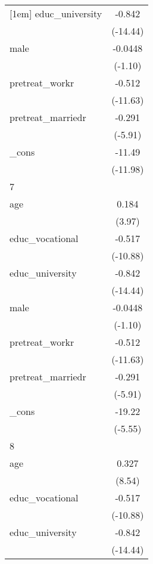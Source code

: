 {\begin{tabular}{l*{1}{c}}
[1em]
educ\_university&      -0.842\sym{***}\\
            &    (-14.44)         \\
[1em]
male        &     -0.0448         \\
            &     (-1.10)         \\
[1em]
pretreat\_workr&      -0.512\sym{***}\\
            &    (-11.63)         \\
[1em]
pretreat\_marriedr&      -0.291\sym{***}\\
            &     (-5.91)         \\
[1em]
\_cons      &      -11.49\sym{***}\\
            &    (-11.98)         \\
\hline
7           &                     \\
age         &       0.184\sym{***}\\
            &      (3.97)         \\
[1em]
educ\_vocational&      -0.517\sym{***}\\
            &    (-10.88)         \\
[1em]
educ\_university&      -0.842\sym{***}\\
            &    (-14.44)         \\
[1em]
male        &     -0.0448         \\
            &     (-1.10)         \\
[1em]
pretreat\_workr&      -0.512\sym{***}\\
            &    (-11.63)         \\
[1em]
pretreat\_marriedr&      -0.291\sym{***}\\
            &     (-5.91)         \\
[1em]
\_cons      &      -19.22\sym{***}\\
            &     (-5.55)         \\
\hline
8           &                     \\
age         &       0.327\sym{***}\\
            &      (8.54)         \\
[1em]
educ\_vocational&      -0.517\sym{***}\\
            &    (-10.88)         \\
[1em]
educ\_university&      -0.842\sym{***}\\
            &    (-14.44)         \\
[1em]

\end{tabular}}
